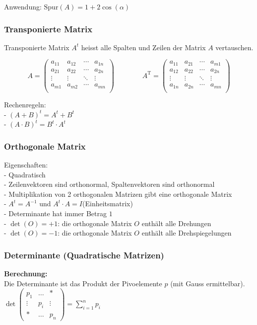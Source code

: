Anwendung: $\mathrm{Spur}(A)=1+2 \cos(\alpha)$

\subsubsection{Transponierte Matrix}
Transponierte Matrix $A^t$ heisst alle Spalten und Zeilen
der Matrix $A$ vertauschen.

\[
	A=  
	\begin{pmatrix} 
		a_{11} & a_{12} & \cdots & a_{1n} \\
		a_{21} & a_{22} & \cdots & a_{2n} \\
		\vdots & \vdots & \ddots & \vdots \\
		a_{m1} & a_{m2} & \cdots & a_{mn} \\
	\end{pmatrix}
	\qquad \qquad 
	A^{\mathrm{T}} = 
	\begin{pmatrix} 
		a_{11} & a_{21} & \cdots & a_{m1} \\
		a_{12} & a_{22} & \cdots & a_{2n} \\
		\vdots & \vdots & \ddots & \vdots \\
		a_{1n} & a_{2n} & \cdots & a_{mn} \\
	\end{pmatrix}
\]

Rechenregeln:\\
- $(A+B)^t=A^t+B^t$\\
- $(A \cdot B)^t=B^t \cdot A^t$


\subsubsection{Orthogonale Matrix}
Eigenschaften:\\
- Quadratisch\\
- Zeilenvektoren sind orthonormal, Spaltenvektoren sind orthonormal\\
- Multiplikation von 2 orthogonalen Matrizen gibt eine orthogonale
Matrix\\
- $A^t=A^{-1}$ und $A^t \cdot A = I$(Einheitsmatrix)\\
- Determinante hat immer Betrag $1$\\
- $\det(O)=+1$: die orthogonale Matrix $O$ enthält alle Drehungen\\
- $\det(O)=-1$: die orthogonale Matrix $O$ enthält alle Drehspiegelungen 


\subsubsection{Determinante (Quadratische Matrizen)}
\textbf{Berechnung:} \\
Die Determinante ist das Produkt der Pivoelemente $p$ (mit
Gauss ermittelbar).  $\det \begin{pmatrix}p_1 & \ldots & \ast \\
\vdots & p_i & \vdots \\ \ast & \ldots & p_n \end{pmatrix} =
\sum\limits_{i=1}^{n}p_i$\\

